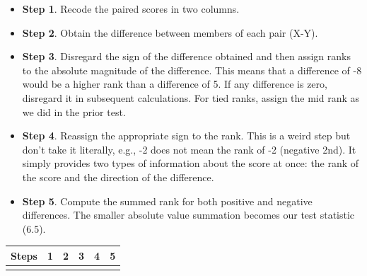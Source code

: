 \documentclass[
  letterpaper,
  DIV=11,
  numbers=noendperiod]{scrreprt}
\begin{document}
\begin{itemize}
\item
  \textbf{Step 1}. Recode the paired scores in two columns.
\item
  \textbf{Step 2}. Obtain the difference between members of each pair
  (X-Y).
\item
  \textbf{Step 3}. Disregard the sign of the difference obtained and
  then assign ranks to the absolute magnitude of the difference. This
  means that a difference of -8 would be a higher rank than a difference
  of 5. If any difference is zero, disregard it in subsequent
  calculations. For tied ranks, assign the mid rank as we did in the
  prior test.
\item
  \textbf{Step 4}. Reassign the appropriate sign to the rank. This is a
  weird step but don't take it literally, e.g., -2 does not mean the
  rank of -2 (negative 2nd). It simply provides two types of information
  about the score at once: the rank of the score and the direction of
  the difference.
\item
  \textbf{Step 5}. Compute the summed rank for both positive and
  negative differences. The smaller absolute value summation becomes our
  test statistic (6.5).
\end{itemize}

\begin{longtable}[]{@{}cccccc@{}}
\toprule\noalign{}
Steps & 1 & 2 & 3 & 4 & 5 \\
\midrule\noalign{}
\endhead
\bottomrule\noalign{}
\endlastfoot
\end{longtable}
\end{document}
